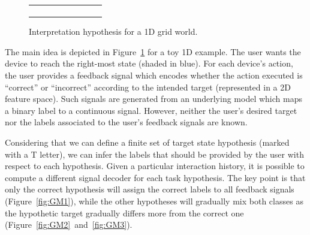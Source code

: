 \documentclass[]{article}
\newcommand{\plotspace}{\vspace{-0.25cm}}
\begin{document}
\begin{figure}[!ht]
\begin{tabular}{c|c|c}
\begin{subfigure}[t]{0.29\columnwidth}
\begin{flushright}
            \end{flushright}
        \end{subfigure}
    \end{tabular}
\caption[]{Interpretation hypothesis for a 1D grid world. \plotspace}
\label{fig:GM}
\end{figure}

The main idea is depicted in Figure~\ref{fig:GM} for a toy 1D example. The user wants the device to reach the right-most state (shaded in blue). For each device's action, the user provides a feedback signal which encodes whether the action executed is ``correct'' or ``incorrect'' according to the intended target (represented in a 2D feature space). Such signals are generated from an underlying model which maps a binary label to a continuous signal. However, neither the user's desired target nor the labels associated to the user's feedback signals are known.


Considering that we can define a finite set of target state hypothesis (marked with a T letter), we can infer the labels that should be provided by the user with respect to each hypothesis. Given a particular interaction history, it is possible to compute a different signal decoder for each task hypothesis. The key point is that only the correct hypothesis will assign the correct labels to all feedback signals (Figure~\ref{fig:GM1}), while the other hypotheses will gradually mix both classes as the hypothetic target gradually differs more from the correct one (Figure~\ref{fig:GM2}~and~\ref{fig:GM3}). 
\end{document}
